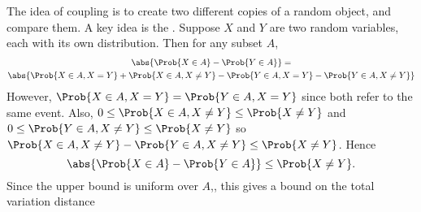 \documentclass[12pt]{article}
\begin{document}
The idea of coupling is to create two different copies of a random
object, and compare them.  A key idea is the .%
Suppose \( X \) and \( Y \) are two random variables, each with its own
distribution.  Then for any subset \( A \),
\begin{multline*}
    \abs{\Prob{X \in A} - \Prob{Y \in A}} = \\
    \abs{ \Prob{X \in A, X = Y} + \Prob{X \in A, X \ne Y } - \Prob{Y \in
    A, X = Y} - \Prob{Y \in A, X \ne Y}}
\end{multline*}
However, \( \Prob{X \in A, X = Y} = \Prob{Y \in A, X = Y} \) since both
refer to the same event.  Also, \( 0 \le \Prob{X \in A, X \ne Y} \le
\Prob{X \ne Y} \) and \( 0 \le \Prob{Y \in A, X \ne Y} \le \Prob{X \ne Y}
\) so \( \Prob{X \in A, X \ne Y} - \Prob{Y \in A, X \ne Y} \le \Prob{X
\ne Y} \).  Hence
\[
    \abs{\Prob{X \in A} - \Prob{Y \in A}} \le \Prob{X \ne Y}.
\] Since the upper bound is uniform over \( A \),, this gives a bound on
the total variation distance
\end{document}

